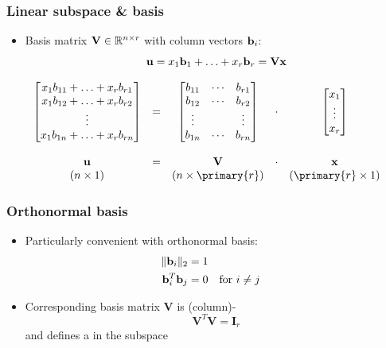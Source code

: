 \documentclass[t]{beamer} %
\begin{document}
\begin{frame}
  \frametitle{Linear subspace \& basis}
  
  \begin{itemize}
  \item Basis matrix $\mathbf{V} \in \mathbb{R}^{n\times r}$ with column vectors $\vb_i$:
    \[
    \vu = x_1 \vb_1 + \ldots + x_r \vb_r = \mathbf{V} \vx
    \]
  \end{itemize}

  \[
  \begin{array}{ccccc}
    \begin{bmatrix}
      x_1 b_{11} + \ldots + x_r b_{r1} \\
      x_1 b_{12} + \ldots + x_r b_{r2} \\
      \vdots\\
      x_1 b_{1n} + \ldots + x_r b_{rn}
    \end{bmatrix}
    & = &
    \begin{bmatrix}
      b_{11} & \cdots & b_{r1} \\
      b_{12} & \cdots & b_{r2} \\
      \vdots & & \vdots \\
      b_{1n} & \cdots & b_{rn}
    \end{bmatrix}
    & \cdot &
    \begin{bmatrix}
      x_1 \\
      \vdots \\
      x_r
    \end{bmatrix} \\
    \\
    \mathbf{u} & = & \mathbf{V} & \cdot & \mathbf{x} \\
    (n\times 1) & & (n\times \primary{r}) & & (\primary{r}\times 1)
  \end{array}
  \]

\end{frame}

\begin{frame}
  \frametitle{Orthonormal basis}

  \begin{itemize}
  \item Particularly convenient with orthonormal basis:
    \begin{align*}
      \norm[2]{\vb_i} &= 1 \\
      \vb_i^T \vb_j &= 0 && \text{for } i\neq j
    \end{align*}
  \item Corresponding basis matrix $\mathbf{V}$ is (column)-
    \[
      \mathbf{V}^T \mathbf{V} = \mathbf{I}_r
    \]
    and defines a  in the subspace
  \end{itemize}
\end{frame}
\end{document}
